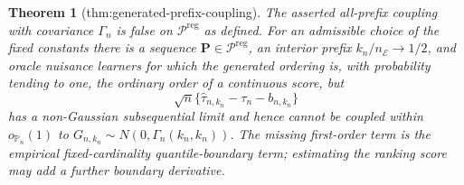 \documentclass{article}
\newtheorem{theorem}{Theorem}
\begin{document}
\begin{theorem}[thm:generated-prefix-coupling]\label{thm:generated-prefix-coupling}
The asserted all-prefix coupling with covariance \(\Gamma_n\) is false on \(\mathcal P^{\mathrm{reg}}\) as defined.  For an admissible choice of the fixed constants there is a sequence \(\mathbf P\in\mathcal P^{\mathrm{reg}}\), an interior prefix \(k_n/n_{\mathcal E}\to1/2\), and oracle nuisance learners for which the generated ordering is, with probability tending to one, the ordinary order of a continuous score, but
\[
 \sqrt n\{\widehat\tau_{n,k_n}-\tau_n-b_{n,k_n}\}
\]
has a non-Gaussian subsequential limit and hence cannot be coupled within \(o_{\mathbb P_n}(1)\) to \(G_{n,k_n}\sim N(0,\Gamma_n(k_n,k_n))\).  The missing first-order term is the empirical fixed-cardinality quantile-boundary term; estimating the ranking score may add a further boundary derivative.
\end{theorem}
\end{document}
